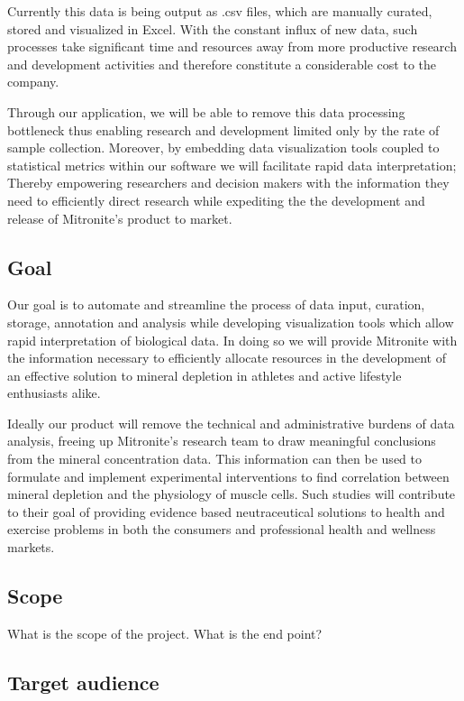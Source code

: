 \documentclass[10pt,twocolumn,letterpaper]{article}
\begin{document}
            Currently this data is being output as .csv files, which are manually curated, stored and visualized in Excel. With the constant influx of new data, such processes take significant time and resources away from more productive research and development activities and therefore constitute a considerable cost to the company.

            Through our application, we will be able to remove this data processing bottleneck thus enabling research and development limited only by the rate of sample collection. Moreover, by embedding data visualization tools coupled to statistical metrics within our software we will facilitate rapid data interpretation; Thereby empowering researchers and decision makers with the information they need to efficiently direct research while expediting the the development and release of Mitronite's product to market.

            \subsection{Goal}

            Our goal is to automate and streamline the process of data input, curation, storage, annotation and analysis while developing visualization tools which allow rapid interpretation of biological data. In doing so we will provide Mitronite with the information necessary to efficiently allocate resources in the development of an effective solution to mineral depletion in athletes and active lifestyle enthusiasts alike.

            Ideally our product will remove the technical and administrative burdens of data analysis, freeing up Mitronite's research team to draw meaningful conclusions from the mineral concentration data. This information can then be used to formulate and implement experimental interventions to find correlation between mineral depletion and the physiology of muscle cells. Such studies will contribute to their goal of providing evidence based neutraceutical solutions to health and exercise problems in both the consumers and professional health and wellness markets.

            \subsection{Scope}

            What is the scope of the project. What is the end point?

            \subsection{Target audience}
\end{document}
